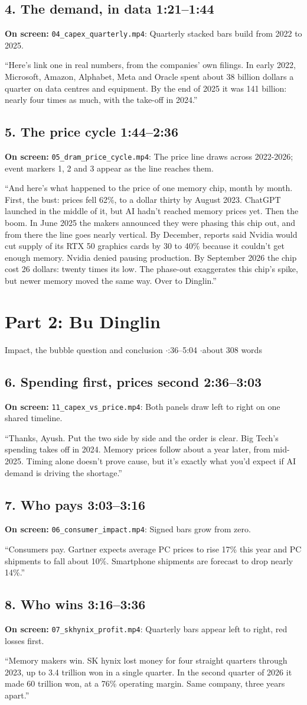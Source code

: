\documentclass[11pt]{article}
\newcommand{\scene}[4]{%
  \needspace{7\baselineskip}\subsection*{#1 \hfill {\normalfont\color{muted}\small #2}}
  {\small\color{muted}\textbf{On screen:} #3}\par\vspace{-0.2em}
  \begin{keybox}#4\end{keybox}}
\begin{document}
\scene{4. The demand, in data}{1:21--1:44}
{\texttt{04\_capex\_quarterly.mp4}: Quarterly stacked bars build from 2022 to 2025.}
{``Here's link one in real numbers, from the companies' own filings. In early 2022, Microsoft, Amazon, Alphabet, Meta and Oracle spent about 38 billion dollars a quarter on data centres and equipment. By the end of 2025 it was 141 billion: nearly four times as much, with the take-off in 2024.''}

\scene{5. The price cycle}{1:44--2:36}
{\texttt{05\_dram\_price\_cycle.mp4}: The price line draws across 2022-2026; event markers 1, 2 and 3 appear as the line reaches them.}
{``And here's what happened to the price of one memory chip, month by month. First, the bust: prices fell 62\%, to a dollar thirty by August 2023. ChatGPT launched in the middle of it, but AI hadn't reached memory prices yet. Then the boom. In June 2025 the makers announced they were phasing this chip out, and from there the line goes nearly vertical. By December, reports said Nvidia would cut supply of its RTX 50 graphics cards by 30 to 40\% because it couldn't get enough memory. Nvidia denied pausing production. By September 2026 the chip cost 26 dollars: twenty times its low. The phase-out exaggerates this chip's spike, but newer memory moved the same way. Over to Dinglin.''}

\section*{Part 2: Bu Dinglin}
{\color{muted}Impact, the bubble question and conclusion \quad$\cdot$:36--5:04 \quad$\cdot$\quad about 308 words}

\scene{6. Spending first, prices second}{2:36--3:03}
{\texttt{11\_capex\_vs\_price.mp4}: Both panels draw left to right on one shared timeline.}
{``Thanks, Ayush. Put the two side by side and the order is clear. Big Tech's spending takes off in 2024. Memory prices follow about a year later, from mid-2025. Timing alone doesn't prove cause, but it's exactly what you'd expect if AI demand is driving the shortage.''}

\scene{7. Who pays}{3:03--3:16}
{\texttt{06\_consumer\_impact.mp4}: Signed bars grow from zero.}
{``Consumers pay. Gartner expects average PC prices to rise 17\% this year and PC shipments to fall about 10\%. Smartphone shipments are forecast to drop nearly 14\%.''}

\scene{8. Who wins}{3:16--3:36}
{\texttt{07\_skhynix\_profit.mp4}: Quarterly bars appear left to right, red losses first.}
{``Memory makers win. SK hynix lost money for four straight quarters through 2023, up to 3.4 trillion won in a single quarter. In the second quarter of 2026 it made 60 trillion won, at a 76\% operating margin. Same company, three years apart.''}
\end{document}
